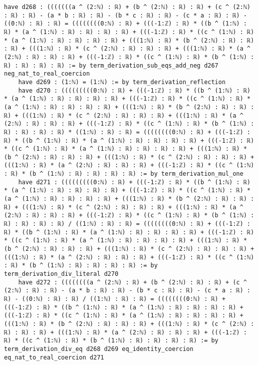 \documentclass{article}
\begin{document}
\begin{tcolorbox}[colback=white!10, width=\linewidth]
\begin{lstlisting}[language=Lean4]
    have d268 : (((((((a ^ (2:ℕ) : ℝ) + (b ^ (2:ℕ) : ℝ) : ℝ) + (c ^ (2:ℕ) : ℝ) : ℝ) - (a * b : ℝ) : ℝ) - (b * c : ℝ) : ℝ) - (c * a : ℝ) : ℝ) - ((0:ℕ) : ℝ) : ℝ) = ((((((((0:ℕ) : ℝ) + (((-1:ℤ) : ℝ) * ((b ^ (1:ℕ) : ℝ) * (a ^ (1:ℕ) : ℝ) : ℝ) : ℝ) : ℝ) + (((-1:ℤ) : ℝ) * ((c ^ (1:ℕ) : ℝ) * (a ^ (1:ℕ) : ℝ) : ℝ) : ℝ) : ℝ) + (((1:ℕ) : ℝ) * (b ^ (2:ℕ) : ℝ) : ℝ) : ℝ) + (((1:ℕ) : ℝ) * (c ^ (2:ℕ) : ℝ) : ℝ) : ℝ) + (((1:ℕ) : ℝ) * (a ^ (2:ℕ) : ℝ) : ℝ) : ℝ) + (((-1:ℤ) : ℝ) * ((c ^ (1:ℕ) : ℝ) * (b ^ (1:ℕ) : ℝ) : ℝ) : ℝ) : ℝ) := by term_derivation_sub_eqs_add_neg d267 neg_nat_to_real_coercion
    have d269 : (1:ℕ) = (1:ℕ) := by term_derivation_reflection
    have d270 : (((((((((0:ℕ) : ℝ) + (((-1:ℤ) : ℝ) * ((b ^ (1:ℕ) : ℝ) * (a ^ (1:ℕ) : ℝ) : ℝ) : ℝ) : ℝ) + (((-1:ℤ) : ℝ) * ((c ^ (1:ℕ) : ℝ) * (a ^ (1:ℕ) : ℝ) : ℝ) : ℝ) : ℝ) + (((1:ℕ) : ℝ) * (b ^ (2:ℕ) : ℝ) : ℝ) : ℝ) + (((1:ℕ) : ℝ) * (c ^ (2:ℕ) : ℝ) : ℝ) : ℝ) + (((1:ℕ) : ℝ) * (a ^ (2:ℕ) : ℝ) : ℝ) : ℝ) + (((-1:ℤ) : ℝ) * ((c ^ (1:ℕ) : ℝ) * (b ^ (1:ℕ) : ℝ) : ℝ) : ℝ) : ℝ) * ((1:ℕ) : ℝ) : ℝ) = ((((((((0:ℕ) : ℝ) + (((-1:ℤ) : ℝ) * ((b ^ (1:ℕ) : ℝ) * (a ^ (1:ℕ) : ℝ) : ℝ) : ℝ) : ℝ) + (((-1:ℤ) : ℝ) * ((c ^ (1:ℕ) : ℝ) * (a ^ (1:ℕ) : ℝ) : ℝ) : ℝ) : ℝ) + (((1:ℕ) : ℝ) * (b ^ (2:ℕ) : ℝ) : ℝ) : ℝ) + (((1:ℕ) : ℝ) * (c ^ (2:ℕ) : ℝ) : ℝ) : ℝ) + (((1:ℕ) : ℝ) * (a ^ (2:ℕ) : ℝ) : ℝ) : ℝ) + (((-1:ℤ) : ℝ) * ((c ^ (1:ℕ) : ℝ) * (b ^ (1:ℕ) : ℝ) : ℝ) : ℝ) : ℝ) := by term_derivation_mul_one
    have d271 : (((((((((0:ℕ) : ℝ) + (((-1:ℤ) : ℝ) * ((b ^ (1:ℕ) : ℝ) * (a ^ (1:ℕ) : ℝ) : ℝ) : ℝ) : ℝ) + (((-1:ℤ) : ℝ) * ((c ^ (1:ℕ) : ℝ) * (a ^ (1:ℕ) : ℝ) : ℝ) : ℝ) : ℝ) + (((1:ℕ) : ℝ) * (b ^ (2:ℕ) : ℝ) : ℝ) : ℝ) + (((1:ℕ) : ℝ) * (c ^ (2:ℕ) : ℝ) : ℝ) : ℝ) + (((1:ℕ) : ℝ) * (a ^ (2:ℕ) : ℝ) : ℝ) : ℝ) + (((-1:ℤ) : ℝ) * ((c ^ (1:ℕ) : ℝ) * (b ^ (1:ℕ) : ℝ) : ℝ) : ℝ) : ℝ) / ((1:ℕ) : ℝ) : ℝ) = ((((((((0:ℕ) : ℝ) + (((-1:ℤ) : ℝ) * ((b ^ (1:ℕ) : ℝ) * (a ^ (1:ℕ) : ℝ) : ℝ) : ℝ) : ℝ) + (((-1:ℤ) : ℝ) * ((c ^ (1:ℕ) : ℝ) * (a ^ (1:ℕ) : ℝ) : ℝ) : ℝ) : ℝ) + (((1:ℕ) : ℝ) * (b ^ (2:ℕ) : ℝ) : ℝ) : ℝ) + (((1:ℕ) : ℝ) * (c ^ (2:ℕ) : ℝ) : ℝ) : ℝ) + (((1:ℕ) : ℝ) * (a ^ (2:ℕ) : ℝ) : ℝ) : ℝ) + (((-1:ℤ) : ℝ) * ((c ^ (1:ℕ) : ℝ) * (b ^ (1:ℕ) : ℝ) : ℝ) : ℝ) : ℝ) := by term_derivation_div_literal d270
    have d272 : ((((((((a ^ (2:ℕ) : ℝ) + (b ^ (2:ℕ) : ℝ) : ℝ) + (c ^ (2:ℕ) : ℝ) : ℝ) - (a * b : ℝ) : ℝ) - (b * c : ℝ) : ℝ) - (c * a : ℝ) : ℝ) - ((0:ℕ) : ℝ) : ℝ) / ((1:ℕ) : ℝ) : ℝ) = ((((((((0:ℕ) : ℝ) + (((-1:ℤ) : ℝ) * ((b ^ (1:ℕ) : ℝ) * (a ^ (1:ℕ) : ℝ) : ℝ) : ℝ) : ℝ) + (((-1:ℤ) : ℝ) * ((c ^ (1:ℕ) : ℝ) * (a ^ (1:ℕ) : ℝ) : ℝ) : ℝ) : ℝ) + (((1:ℕ) : ℝ) * (b ^ (2:ℕ) : ℝ) : ℝ) : ℝ) + (((1:ℕ) : ℝ) * (c ^ (2:ℕ) : ℝ) : ℝ) : ℝ) + (((1:ℕ) : ℝ) * (a ^ (2:ℕ) : ℝ) : ℝ) : ℝ) + (((-1:ℤ) : ℝ) * ((c ^ (1:ℕ) : ℝ) * (b ^ (1:ℕ) : ℝ) : ℝ) : ℝ) : ℝ) := by term_derivation_div_eq d268 d269 eq_identity_coercion eq_nat_to_real_coercion d271

\end{lstlisting}
\end{tcolorbox}
\end{document}
